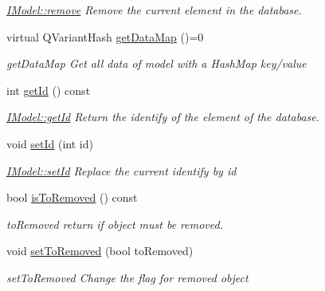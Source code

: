 \begin{DoxyCompactItemize}
\begin{DoxyCompactList}\small\item\em \hyperlink{classModels_1_1IModel_a290473739e709321c818f4451e05e619}{I\+Model\+::remove} Remove the current element in the database. \end{DoxyCompactList}\item 
virtual Q\+Variant\+Hash \hyperlink{classModels_1_1IModel_a9851b0f296aac58353edff22af11cf3c}{get\+Data\+Map} ()=0
\begin{DoxyCompactList}\small\item\em get\+Data\+Map Get all data of model with a Hash\+Map key/value \end{DoxyCompactList}\item 
int \hyperlink{classModels_1_1IModel_a63087bb34da8c38a11109cd775122d31}{get\+Id} () const 
\begin{DoxyCompactList}\small\item\em \hyperlink{classModels_1_1IModel_a63087bb34da8c38a11109cd775122d31}{I\+Model\+::get\+Id} Return the identify of the element of the database. \end{DoxyCompactList}\item 
void \hyperlink{classModels_1_1IModel_ac99cb8ca4004755b1445fb5f66973341}{set\+Id} (int id)
\begin{DoxyCompactList}\small\item\em \hyperlink{classModels_1_1IModel_ac99cb8ca4004755b1445fb5f66973341}{I\+Model\+::set\+Id} Replace the current identify by {\itshape id} \end{DoxyCompactList}\item 
bool \hyperlink{classModels_1_1IModel_adecabe4161742cfc81ddbadc6706d9e9}{is\+To\+Removed} () const 
\begin{DoxyCompactList}\small\item\em to\+Removed return if object must be removed. \end{DoxyCompactList}\item 
void \hyperlink{classModels_1_1IModel_abfbfbc6c7de50ad4536027a964b2521c}{set\+To\+Removed} (bool to\+Removed)
\begin{DoxyCompactList}\small\item\em set\+To\+Removed Change the flag for removed object \end{DoxyCompactList}\end{DoxyCompactItemize}
